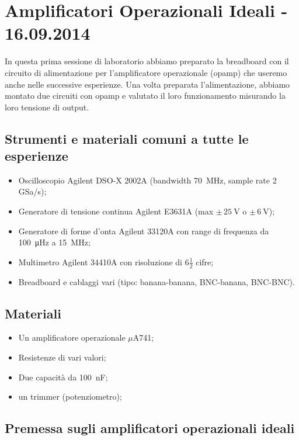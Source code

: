 \section{Amplificatori Operazionali Ideali - 16.09.2014}

In questa prima sessione di laboratorio abbiamo preparato la breadboard con il circuito di alimentazione per l'amplificatore operazionale (opamp) che useremo anche nelle successive esperienze.
Una volta preparata l'alimentazione, abbiamo montato due circuiti con opamp e valutato il loro funzionamento misurando la loro tensione di output.

\subsection*{Strumenti e materiali comuni a tutte le esperienze}

\begin{itemize} [noitemsep]
\item Oscilloscopio Agilent DSO-X 2002A (bandwidth \SI{70}{\mega\hertz}, sample rate \num{2} GSa/s);
\item Generatore di tensione continua Agilent E3631A (max $\pm \, \SI{25}{\volt}$ o $\pm \, \SI{6}{\volt}$);
\item Generatore di forme d'onta Agilent 33120A con range di frequenza da \SI{100}{\micro\hertz} a \SI{15}{\mega\hertz};
\item Multimetro Agilent 34410A con risoluzione di 6$\frac{1}{2}$ cifre;
\item Breadboard e cablaggi vari (tipo: banana-banana, BNC-banana, BNC-BNC).
\end{itemize}
\subsection*{Materiali}

\begin{itemize} [noitemsep]
\item Un amplificatore operazionale $\mu$A741;
\item Resistenze di vari valori;
\item Due capacità da \SI{100}{\nano\farad};
\item un trimmer (potenziometro);
\end{itemize}

\subsection{Premessa sugli amplificatori operazionali ideali}

